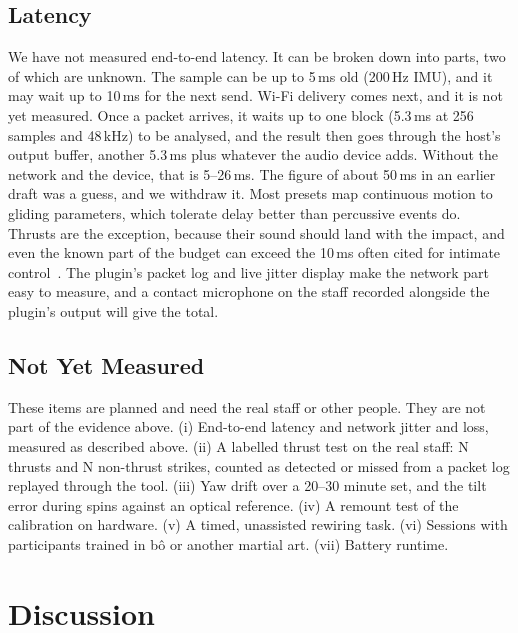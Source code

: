\documentclass[sigconf,nonacm]{acmart}
\begin{document}
\subsection{Latency}
\label{sec:latency}
We have not measured end-to-end latency. It can be broken down into parts, two of which are
unknown. The sample can be up to 5\,ms old (200\,Hz IMU), and it may wait up to 10\,ms for the next
send. Wi-Fi delivery comes next, and it is not yet measured. Once a packet arrives, it waits up to one
block (5.3\,ms at 256 samples and 48\,kHz) to be analysed, and the result then goes through the
host's output buffer, another 5.3\,ms plus whatever the audio device adds. Without the network and
the device, that is 5--26\,ms. The figure of about 50\,ms in an earlier draft was a guess, and we
withdraw it. Most presets map continuous motion to gliding parameters, which tolerate delay better
than percussive events do. Thrusts are the exception, because their sound should land with the
impact, and even the known part of the budget can exceed the 10\,ms often cited for intimate
control~\cite{wessel2002intimate}. The plugin's packet log and live jitter display make the network
part easy to measure, and a contact microphone on the staff recorded alongside the plugin's output
will give the total.

\subsection{Not Yet Measured}
\label{sec:not-measured}
These items are planned and need the real staff or other people. They are not part of the evidence
above.
(i) End-to-end latency and network jitter and loss, measured as described above. (ii) A labelled
thrust test on the real staff: N thrusts and N non-thrust strikes, counted as detected or missed
from a packet log replayed through the tool. (iii) Yaw drift over a 20--30 minute set, and the tilt
error during spins against an optical reference. (iv) A remount test of the calibration on
hardware. (v) A timed, unassisted rewiring task. (vi) Sessions with participants trained in b\^o or
another martial art. (vii) Battery runtime.

\section{Discussion}
\end{document}
